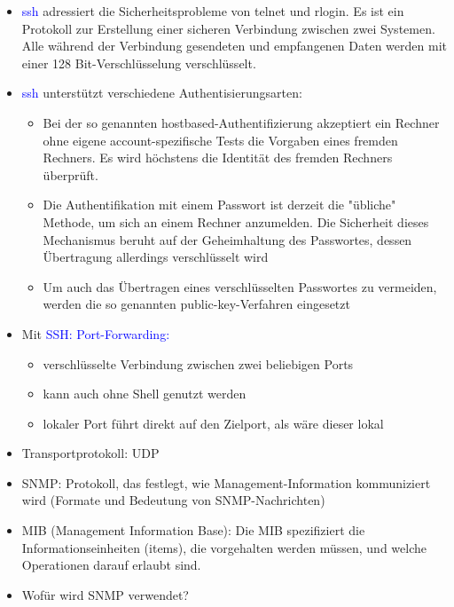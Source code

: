 \begin{itemize}
    \item \textcolor{blue}{ssh} adressiert die Sicherheitsprobleme von telnet und rlogin.
    Es ist ein Protokoll zur Erstellung einer sicheren Verbindung zwischen zwei Systemen.
    Alle während der Verbindung gesendeten und empfangenen Daten werden mit einer 128 Bit-Verschlüsselung verschlüsselt.
    \item \textcolor{blue}{ssh} unterstützt verschiedene Authentisierungsarten:
    \begin{itemize}
        \item Bei der so genannten hostbased-Authentifizierung akzeptiert ein Rechner ohne eigene account-spezifische Tests die Vorgaben eines fremden Rechners.
        Es wird höchstens die Identität des fremden Rechners überprüft.
        \item Die Authentifikation mit einem Passwort ist derzeit die "übliche" Methode, um sich an einem Rechner anzumelden.
        Die Sicherheit dieses Mechanismus beruht auf der Geheimhaltung des Passwortes, dessen Übertragung allerdings verschlüsselt wird
        \item Um auch das Übertragen eines verschlüsselten Passwortes zu vermeiden, werden die so genannten public-key-Verfahren eingesetzt
    \end{itemize}
\end{itemize}

\begin{itemize}
    \item Mit \textcolor{blue}{SSH: Port-Forwarding:}
    \begin{itemize}
        \item verschlüsselte Verbindung zwischen zwei beliebigen Ports
        \item kann auch ohne Shell genutzt werden
        \item lokaler Port führt direkt auf den Zielport, als wäre dieser lokal
    \end{itemize}
\end{itemize}

\begin{itemize}
    \item Transportprotokoll: UDP
    \item SNMP: Protokoll, das festlegt, wie Management-Information kommuniziert wird (Formate und Bedeutung von SNMP-Nachrichten)
    \item MIB (Management Information Base): Die MIB spezifiziert die Informationseinheiten (items), die vorgehalten werden müssen, und welche Operationen darauf erlaubt sind.
    \item {} Wofür wird SNMP verwendet?
\end{itemize}